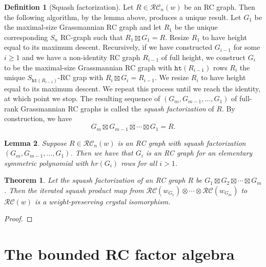 \documentclass{amsart}
\newtheorem{lemma}{Lemma}[section]
\newtheorem{proposition}[lemma]{Proposition}
\newtheorem{theorem}{Theorem}[section]
\theoremstyle{definition}
\newtheorem{definition}[lemma]{Definition}
\theoremstyle{remark}
\numberwithin{equation}{section}
\newcommand{\RC}{\mathcal{RC}}
\newcommand{\wof}[1]{w_{#1}}
\newcommand{\wtt}{\mathtt{wt}}
\newcommand{\hr}{\mathtt{ht}}
\begin{document}
\begin{definition}[Squash factorization]
Let $R\in \RC_n(w)$ be an RC graph. Then the following algorithm, by the lemma above, produces a unique result. Let $G_1$ be the maximal-size Grassmannian RC graph and let $R_1$ be the unique corresponding $S_n$ RC-graph such that $R_1\boxtimes G_1=R$. Resize $R_1$ to have height equal to its maximum descent. Recursively, if we have constructed $G_{i-1}$ for some $i\geq 1$ and we have a non-identity RC graph $R_{i-1}$ of full height, we construct $G_i$ to be the maximal-size Grassmannian RC graph with $\hr(R_{i-1})$ rows $R_i$ the unique $S_{\hr(R_{i-1})}$-RC grap with $R_i\boxtimes G_i=R_{i-1}$. We resize $R_i$ to have height equal to its maximum descent. We repeat this process until we reach the identity, at which point we stop. The resulting sequence of $(G_{m}, G_{m-1},\ldots,G_1)$ of full-rank Grassmannian RC graphs is called the \textit{squash factorization} of $R$. By construction, we have
$$G_{m}\boxtimes G_{m-1}\boxtimes \cdots \boxtimes G_1=R.$$
\end{definition}

\begin{lemma}
Suppose $R\in \RC_n(w)$ is an RC graph with squash factorization $(G_{m}, G_{m-1},\ldots,G_1)$. Then we have that $G_i$ is an RC graph for an elementary symmetric polynomial with $hr(G_i)$ rows for all $i>1$.
\end{lemma}

\begin{theorem}
  Let the squash factorization of an RC graph $R$ be $G_1\boxtimes G_2\boxtimes \cdots \boxtimes G_m$. Then the iterated squash product map from $\RC(\wof{G_1})\otimes \cdots \otimes \RC(\wof{G_m})$ to $\RC(w)$ is a weight-preserving crystal isomorphism.
\end{theorem}
\begin{proof}
\end{proof}

\section{The bounded RC factor algebra}\label{section:algebra}
\end{document}
